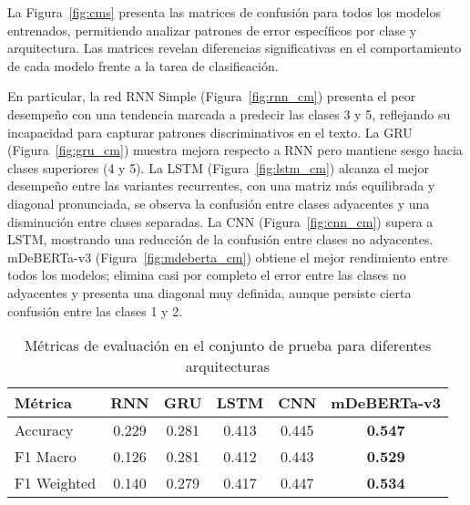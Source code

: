 \documentclass[paper=letter, fontsize=11pt, draft=false]{scrartcl}
\numberwithin{equation}{section} %
\numberwithin{figure}{section} %
\numberwithin{table}{section} %
\numberwithin{subsection}{section}
\begin{document}
La Figura~\ref{fig:cms} presenta las matrices de confusión para todos los modelos entrenados, permitiendo analizar patrones de error específicos por clase y arquitectura. Las matrices revelan diferencias significativas en el comportamiento de cada modelo frente a la tarea de clasificación.

En particular, la red RNN Simple (Figura~\ref{fig:rnn_cm}) presenta el peor desempeño con una tendencia marcada a predecir las clases 3 y 5, reflejando su incapacidad para capturar patrones discriminativos en el texto. La GRU (Figura~\ref{fig:gru_cm}) muestra mejora respecto a RNN pero mantiene sesgo hacia clases superiores (4 y 5). La LSTM (Figura~\ref{fig:lstm_cm}) alcanza el mejor desempeño entre las variantes recurrentes, con una matriz más equilibrada y diagonal pronunciada, se observa la confusión entre clases adyacentes y una disminución entre clases separadas. La CNN (Figura~\ref{fig:cnn_cm}) supera a LSTM, mostrando una reducción de la confusión entre clases no adyacentes. mDeBERTa-v3 (Figura~\ref{fig:mdeberta_cm}) obtiene el mejor rendimiento entre todos los modelos; elimina casi por completo el error entre las clases no adyacentes y presenta una diagonal muy definida, aunque persiste cierta confusión entre las clases 1 y 2.

\begin{table}[H]
\centering

\begin{tabular}{lccccc}
\toprule
\textbf{Métrica} & \textbf{RNN} & \textbf{GRU} & \textbf{LSTM} & \textbf{CNN} & \textbf{mDeBERTa-v3} \\
\midrule
Accuracy         & 0.229        & 0.281        & 0.413         & 0.445        & \textbf{0.547} \\
F1 Macro         & 0.126        & 0.281        & 0.412         & 0.443        & \textbf{0.529} \\
F1 Weighted      & 0.140        & 0.279        & 0.417         & 0.447        & \textbf{0.534} \\
\bottomrule
\end{tabular}
\caption{Métricas de evaluación en el conjunto de prueba para diferentes arquitecturas}
\label{tab:metricas_modelos}
\end{table}
\end{document}
